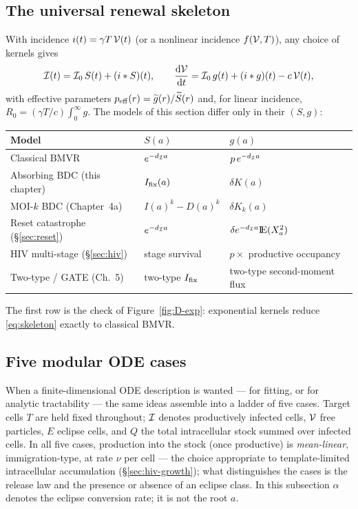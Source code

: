 \subsection{The universal renewal skeleton}
\label{sec:skeleton}

With incidence $i(t)=\gamma T\,\mathcal{V}(t)$ (or a nonlinear incidence
$f(\mathcal{V},T)$), any choice of kernels gives
\begin{equation}
\mathcal{I}(t)=\mathcal{I}_0\,S(t)+(i*S)(t),
\qquad
\displaystyle\frac{{\rm d} \mathcal{V}}{{\rm d} t}=\mathcal{I}_0\,g(t)+(i*g)(t)-c\,\mathcal{V}(t),
\label{eq:skeleton}
\end{equation}
with effective parameters $p_{\rm eff}(r)=\widetilde{g}(r)/\widetilde{S}(r)$ and, for
linear incidence, $R_0=(\gamma T/c)\int_0^\infty g$. The models of this
section differ only in their $(S,g)$:
\begin{center}
\renewcommand{\arraystretch}{1.2}
\small
\begin{tabular}{@{}lll@{}}
\toprule
Model & $S(a)$ & $g(a)$ \\
\midrule
Classical BMVR & $e^{-d_{\mathcal{I}} a}$ & $p\,e^{-d_{\mathcal{I}} a}$ \\
Absorbing BDC (this chapter) & $I_{\mathrm{fix}}(a)$ & $\delta K(a)$ \\
MOI-$k$ BDC (Chapter~4a) & $I(a)^k-D(a)^k$ & $\delta K_k(a)$ \\
Reset catastrophe (\S\ref{sec:reset}) & $e^{-d_{\mathcal{I}} a}$ & $\delta e^{-d_{\mathcal{I}}a}{\rm I}\!{\rm E}(X_a^2)$ \\
HIV multi-stage (\S\ref{sec:hiv}) & stage survival & $p\times$ productive occupancy \\
Two-type / GATE (Ch.~5) & two-type $I_{\mathrm{fix}}$ & two-type second-moment flux \\
\bottomrule
\end{tabular}
\end{center}
The first row is the check of Figure~\ref{fig:D-exp}: exponential kernels
reduce \eqref{eq:skeleton} exactly to classical BMVR.

\subsection{Five modular ODE cases}
\label{sec:five-cases}

When a finite-dimensional ODE description is wanted --- for fitting, or for
analytic tractability --- the same ideas assemble into a ladder of five
cases. Target cells $T$ are held fixed throughout; $\mathcal{I}$ denotes
productively infected cells, $\mathcal{V}$ free particles, $E$ eclipse cells,
and $Q$ the total intracellular stock summed over infected cells. In all
five cases, production into the stock (once productive) is
\emph{mean-linear}, immigration-type, at rate $\nu$ per cell --- the choice
appropriate to template-limited intracellular accumulation
(\S\ref{sec:hiv-growth}); what distinguishes the cases is the release law
and the presence or absence of an eclipse class. In this subsection
$\alpha$ denotes the eclipse conversion rate; it is not the root $a$.

